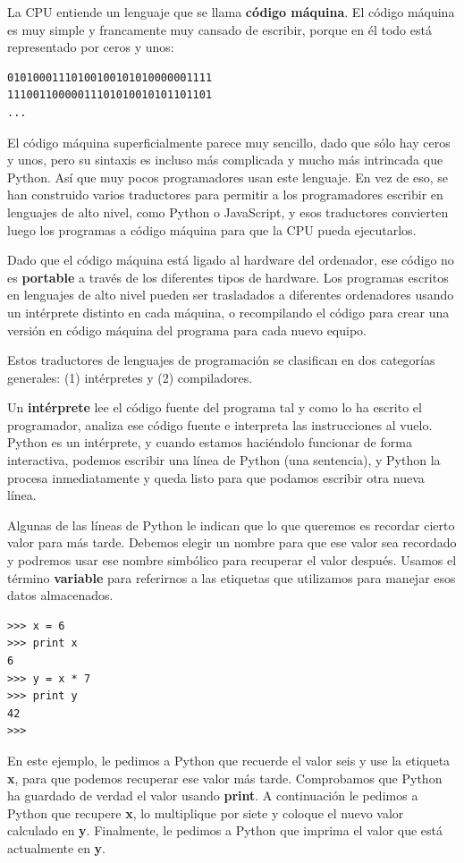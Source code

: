 La CPU entiende un lenguaje que se llama {\bf código máquina}. El código
máquina es muy simple y francamente muy cansado de escribir, porque
en él todo está representado por ceros y unos:

\beforeverb
\begin{verbatim}
01010001110100100101010000001111
11100110000011101010010101101101
...
\end{verbatim}
\afterverb
%
El código máquina superficialmente parece muy sencillo, dado que sólo hay
ceros y unos, pero su sintaxis es incluso más complicada
y mucho más intrincada que Python. Así que muy pocos programadores
usan este lenguaje. En vez de eso, se han construido varios traductores para
permitir a los programadores escribir en lenguajes de alto nivel, como Python
o JavaScript, y esos traductores convierten luego los programas a código máquina
para que la CPU pueda ejecutarlos.

Dado que el código máquina está ligado al hardware del ordenador, ese código
no es {\bf portable} a través de los diferentes tipos de hardware. Los programas escritos
en lenguajes de alto nivel pueden ser trasladados a diferentes ordenadores usando
un intérprete distinto en cada máquina, o recompilando el código para crear
una versión en código máquina del programa para cada nuevo equipo.

Estos traductores de lenguajes de programación se clasifican en dos categorías generales:
(1) intérpretes y (2) compiladores.

Un {\bf intérprete} lee el código fuente del programa tal y como lo ha escrito
el programador, analiza ese código fuente e interpreta las instrucciones al vuelo.
Python es un intérprete, y cuando estamos haciéndolo funcionar de forma interactiva,
podemos escribir una línea de Python (una sentencia), y Python la procesa inmediatamente
y queda listo para que podamos escribir otra nueva línea.

Algunas de las líneas de Python le indican que lo que queremos es recordar cierto
valor para más tarde. Debemos elegir un nombre para que ese valor sea recordado y
podremos usar ese nombre simbólico para recuperar el valor después. Usamos el
término {\bf variable} para referirnos a las etiquetas que utilizamos para manejar esos
datos almacenados.

\beforeverb
\begin{verbatim}
>>> x = 6
>>> print x
6
>>> y = x * 7
>>> print y
42
>>> 
\end{verbatim}
\afterverb
%
En este ejemplo, le pedimos a Python que recuerde el valor seis y use la etiqueta {\bf x},
para que podemos recuperar ese valor más tarde. Comprobamos que Python ha guardado de
verdad el valor usando {\bf print}. A continuación le pedimos a Python que recupere {\bf x},
lo multiplique por siete y coloque el nuevo valor calculado en {\bf y}.
Finalmente, le pedimos a Python que imprima el valor que está actualmente en {\bf y}.

